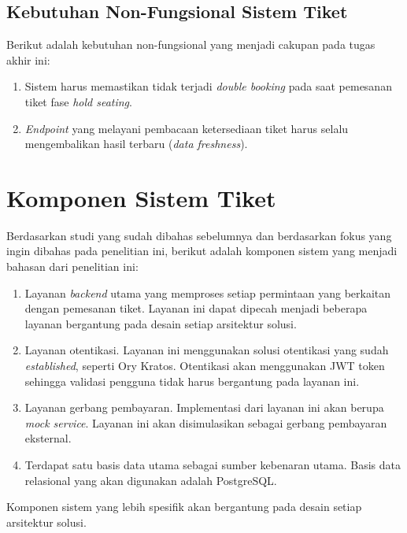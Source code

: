 \subsection{Kebutuhan Non-Fungsional Sistem Tiket}

Berikut adalah kebutuhan non-fungsional yang menjadi cakupan pada tugas akhir ini:

\begin{enumerate}
    \item Sistem harus memastikan tidak terjadi \textit{double booking} pada saat pemesanan tiket fase \textit{hold seating}.
    \item \textit{Endpoint} yang melayani pembacaan ketersediaan tiket harus selalu mengembalikan hasil terbaru (\textit{data freshness}).
\end{enumerate}

\section{Komponen Sistem Tiket}

Berdasarkan studi yang sudah dibahas sebelumnya dan berdasarkan fokus yang ingin dibahas pada penelitian ini, berikut adalah komponen sistem yang menjadi bahasan dari penelitian ini:

\begin{enumerate}
    \item Layanan \textit{backend} utama yang memproses setiap permintaan yang berkaitan dengan pemesanan tiket. Layanan ini dapat dipecah menjadi beberapa layanan bergantung pada desain setiap arsitektur solusi.
    \item Layanan otentikasi. Layanan ini menggunakan solusi otentikasi yang sudah \textit{established}, seperti Ory Kratos. Otentikasi akan menggunakan JWT token sehingga validasi pengguna tidak harus bergantung pada layanan ini.
    \item Layanan gerbang pembayaran. Implementasi dari layanan ini akan berupa \textit{mock service}. Layanan ini akan disimulasikan sebagai gerbang pembayaran eksternal.
    \item Terdapat satu basis data utama sebagai sumber kebenaran utama. Basis data relasional yang akan digunakan adalah PostgreSQL.
\end{enumerate}

Komponen sistem yang lebih spesifik akan bergantung pada desain setiap arsitektur solusi.